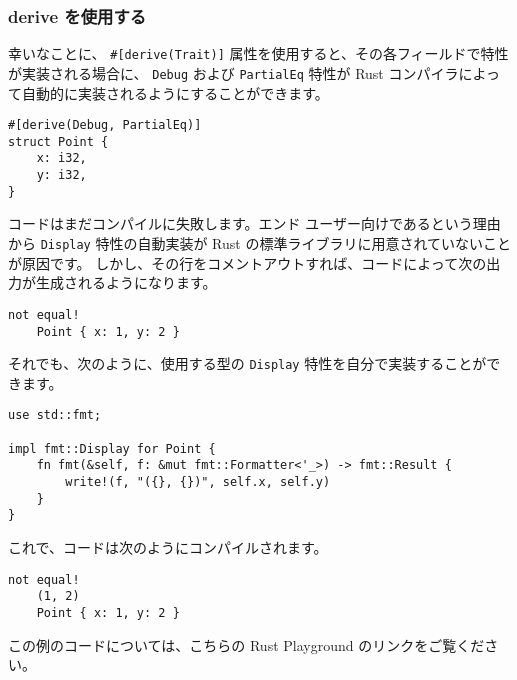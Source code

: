 \subsubsection{derive を使用する}

幸いなことに、 \texttt{#[derive(Trait)]} 属性を使用すると、その各フィールドで特性が実装される場合に、 \texttt{Debug} および \texttt{PartialEq} 特性が Rust コンパイラによって自動的に実装されるようにすることができます。

\begin{lstlisting}[numbers=none]
#[derive(Debug, PartialEq)]
struct Point {
    x: i32,
    y: i32,
}
\end{lstlisting}

コードはまだコンパイルに失敗します。エンド ユーザー向けであるという理由から \texttt{Display} 特性の自動実装が Rust の標準ライブラリに用意されていないことが原因です。 しかし、その行をコメントアウトすれば、コードによって次の出力が生成されるようになります。

\begin{lstlisting}[numbers=none]
    not equal!
    Point { x: 1, y: 2 }
\end{lstlisting}

それでも、次のように、使用する型の \texttt{Display} 特性を自分で実装することができます。

\begin{lstlisting}[numbers=none]
use std::fmt;

impl fmt::Display for Point {
    fn fmt(&self, f: &mut fmt::Formatter<'_>) -> fmt::Result {
        write!(f, "({}, {})", self.x, self.y)
    }
}
\end{lstlisting}

これで、コードは次のようにコンパイルされます。

\begin{lstlisting}[numbers=none]
    not equal!
    (1, 2)
    Point { x: 1, y: 2 }
\end{lstlisting}

この例のコードについては、こちらの Rust Playground のリンクをご覧ください。

